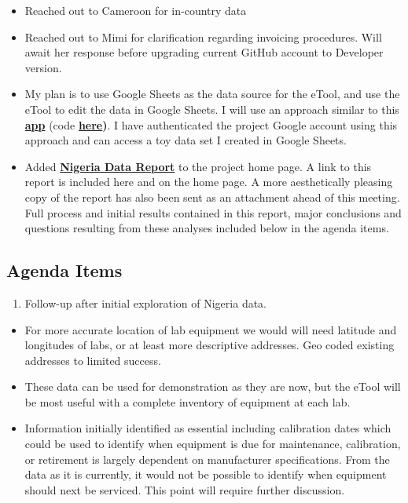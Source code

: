 \documentclass[]{article}
\providecommand{\tightlist}{%
  \setlength{\itemsep}{0pt}\setlength{\parskip}{0pt}}
\begin{document}
\begin{itemize}
\tightlist
\item
  Reached out to Cameroon for in-country data
\item
  Reached out to Mimi for clarification regarding invoicing procedures.
  Will await her response before upgrading current GitHub account to
  Developer version.
\item
  My plan is to use Google Sheets as the data source for the eTool, and
  use the eTool to edit the data in Google Sheets. I will use an
  approach similar to this
  \textbf{\href{https://jennybc.shinyapps.io/10_read-write-private-sheet/}{app}}
  (code
  \textbf{\href{https://github.com/jennybc/googlesheets/tree/master/inst/shiny-examples/10_read-write-private-sheet}{here})}.
  I have authenticated the project Google account using this approach
  and can access a toy data set I created in Google Sheets.
\item
  Added
  \textbf{\href{https://github.com/paceafenet/etool_dev/blob/master/existing_lab_data_exploration.md}{Nigeria
  Data Report}} to the project home page. A link to this report is
  included here and on the home page. A more aesthetically pleasing copy
  of the report has also been sent as an attachment ahead of this
  meeting. Full process and initial results contained in this report,
  major conclusions and questions resulting from these analyses included
  below in the agenda items.
\end{itemize}

\hypertarget{agenda-items-13}{%
\subsection{Agenda Items}\label{agenda-items-13}}

\begin{enumerate}
\def\labelenumi{\arabic{enumi}.}
\tightlist
\item
  Follow-up after initial exploration of Nigeria data.
\end{enumerate}

\begin{itemize}
\tightlist
\item
  For more accurate location of lab equipment we would will need
  latitude and longitudes of labs, or at least more descriptive
  addresses. Geo coded existing addresses to limited success.
\item
  These data can be used for demonstration as they are now, but the
  eTool will be most useful with a complete inventory of equipment at
  each lab.
\item
  Information initially identified as essential including calibration
  dates which could be used to identify when equipment is due for
  maintenance, calibration, or retirement is largely dependent on
  manufacturer specifications. From the data as it is currently, it
  would not be possible to identify when equipment should next be
  serviced. This point will require further discussion.
\end{itemize}
\end{document}
